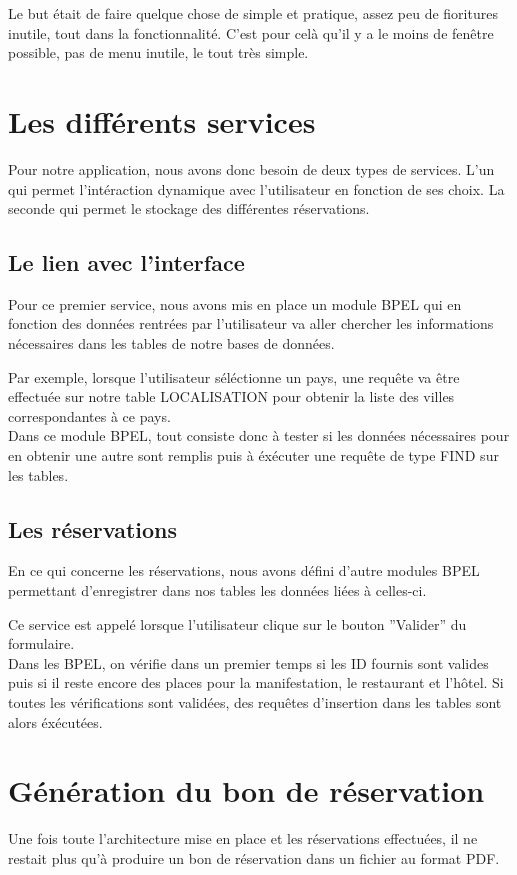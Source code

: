 \documentclass[11pt,a4paper]{article}
\begin{document}
Le but était de faire quelque chose de simple et pratique, assez peu de fioritures inutile, tout dans la fonctionnalité. C'est pour celà qu'il y a le moins de fenêtre possible, pas de menu inutile, le tout très simple.



\section{Les différents services}
Pour notre application, nous avons donc besoin de deux types de services. L'un
qui permet l'intéraction dynamique avec l'utilisateur en fonction de ses
choix. La seconde qui permet le stockage des différentes réservations.
\subsection{Le lien avec l'interface}
Pour ce premier service, nous avons mis en place un module BPEL qui en fonction
des données rentrées par l'utilisateur va aller chercher les informations
nécessaires dans les tables de notre bases de données. 

Par exemple, lorsque l'utilisateur séléctionne un pays, une requête va être
effectuée sur notre table LOCALISATION pour obtenir la liste des villes
correspondantes à ce pays.\\

Dans ce module BPEL, tout consiste donc à tester si les données nécessaires
pour en obtenir une autre sont remplis puis à éxécuter une requête de type FIND
sur les tables.

\subsection{Les réservations}
En ce qui concerne les réservations, nous avons défini d'autre modules BPEL
permettant d'enregistrer dans nos tables les données liées à celles-ci.

Ce service est appelé lorsque l'utilisateur clique sur le bouton ''Valider''
du formulaire.\\ 

Dans les BPEL, on vérifie dans un premier temps si les ID fournis sont valides
puis si il reste encore des places pour la manifestation, le restaurant et
l'hôtel. Si toutes les vérifications sont validées, des requêtes d'insertion
dans les tables sont alors éxécutées.


\section{Génération du bon de réservation}
Une fois toute l'architecture mise en place et les réservations effectuées, il
ne restait plus qu'à produire un bon de réservation dans un fichier au format
PDF.\\
\end{document}
